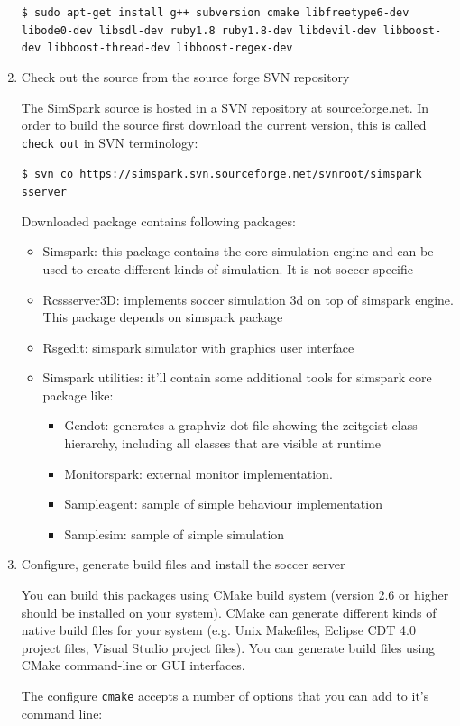 \begin{enumerate}
\texttt{\$ sudo apt-get install g++ subversion cmake libfreetype6-dev libode0-dev libsdl-dev ruby1.8 ruby1.8-dev libdevil-dev libboost-dev libboost-thread-dev libboost-regex-dev}

\item Check out the source from the source forge SVN repository

The SimSpark source is hosted in a SVN repository at
sourceforge.net. In order to build the source first download the
current version, this is called \texttt{check out} in SVN terminology:

\texttt{\$ svn co https://simspark.svn.sourceforge.net/svnroot/simspark sserver}

Downloaded package contains following packages:
\begin{itemize}
\item Simspark: this package contains the core simulation engine and
can be used to create different kinds of simulation. It is not soccer
specific
\item Rcssserver3D: implements soccer simulation 3d on top of simspark
engine. This package depends on simspark package
\item Rsgedit: simspark simulator with graphics user interface
\item Simspark utilities: it'll contain some additional tools for
simspark core package like:
\begin{itemize}
\item Gendot: generates a graphviz dot file showing the zeitgeist class hierarchy, including all classes that are visible at runtime
\item Monitorspark: external monitor implementation.
\item Sampleagent: sample of simple behaviour implementation
\item Samplesim: sample of simple simulation
\end{itemize}
\end{itemize}

\item Configure, generate build files and install the soccer server

You can build this packages using CMake build system (version 2.6 or higher
should be installed on your system). CMake can generate different kinds of
native build files for your system (e.g. Unix Makefiles, Eclipse CDT 4.0 project
files, Visual Studio project files). You can generate build files using CMake
command-line or GUI interfaces.

The configure \texttt{cmake} accepts a number of options that you can add to it's
command line:


\end{enumerate}
